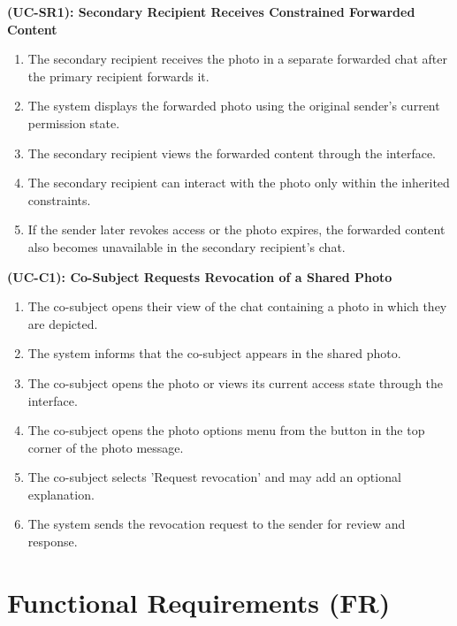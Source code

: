 \textbf{(UC-SR1): Secondary Recipient Receives Constrained Forwarded Content}
\begin{enumerate}
  \item The secondary recipient receives the photo in a separate forwarded chat after the primary recipient forwards it.
  \item The system displays the forwarded photo using the original sender's current permission state.
  \item The secondary recipient views the forwarded content through the interface.
  \item The secondary recipient can interact with the photo only within the inherited constraints.
  \item If the sender later revokes access or the photo expires, the forwarded content also becomes unavailable in the secondary recipient's chat.
\end{enumerate}

\textbf{(UC-C1): Co-Subject Requests Revocation of a Shared Photo}
\begin{enumerate}
    \item The co-subject opens their view of the chat containing a photo in which they are depicted.
    \item The system informs that the co-subject appears in the shared photo.
    \item The co-subject opens the photo or views its current access state through the interface.
    \item The co-subject opens the photo options menu from the button in the top corner of the photo message.
    \item The co-subject selects 'Request revocation' and may add an optional explanation.
    \item The system sends the revocation request to the sender for review and response.
\end{enumerate}

\newpage

\section{Functional Requirements (FR)}
\small\setlength{\tabcolsep}{5pt}
\renewcommand{\arraystretch}{0.9}


